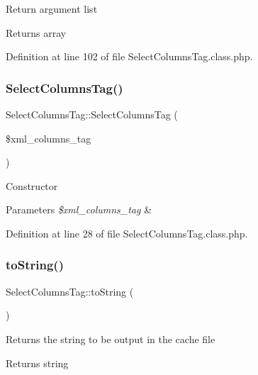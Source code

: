 Return argument list

\begin{DoxyReturn}{Returns}
array 
\end{DoxyReturn}


Definition at line 102 of file Select\+Columns\+Tag.\+class.\+php.

\mbox{\label{classSelectColumnsTag_a272d801d4a575217cd168a99bc7648a7}} 
\subsubsection{\texorpdfstring{Select\+Columns\+Tag()}{SelectColumnsTag()}}
{\footnotesize\ttfamily Select\+Columns\+Tag\+::\+Select\+Columns\+Tag (\begin{DoxyParamCaption}\item[{}]{\$xml\+\_\+columns\+\_\+tag }\end{DoxyParamCaption})}

Constructor


\begin{DoxyParams}{Parameters}
{\em \$xml\+\_\+columns\+\_\+tag} & \\
\hline
\end{DoxyParams}


Definition at line 28 of file Select\+Columns\+Tag.\+class.\+php.

\mbox{\label{classSelectColumnsTag_a5780a3688343fd43d59071e966a64bef}} 
\subsubsection{\texorpdfstring{to\+String()}{toString()}}
{\footnotesize\ttfamily Select\+Columns\+Tag\+::to\+String (\begin{DoxyParamCaption}{ }\end{DoxyParamCaption})}

Returns the string to be output in the cache file

\begin{DoxyReturn}{Returns}
string 
\end{DoxyReturn}



